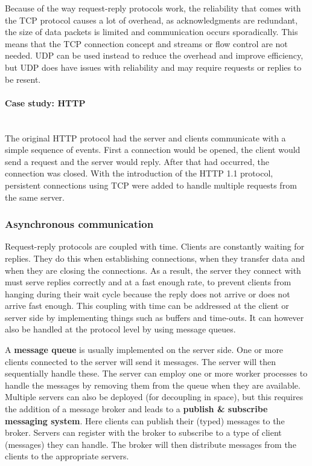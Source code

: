 \documentclass[a4paper]{article}
\newcommand{\subsubsubsection}[1]{\paragraph{#1}\mbox{}\\}
\begin{document}
Because of the way request-reply protocols work, the reliability that comes with the TCP protocol causes a lot of overhead, as acknowledgments are redundant, the size of data packets is limited and communication occurs sporadically. This means that the TCP connection concept and streams or flow control are not needed. UDP can be used instead to reduce the overhead and improve efficiency, but UDP does have issues with reliability and may require requests or replies to be resent.

\subsubsubsection{Case study: HTTP}

The original HTTP protocol had the server and clients communicate with a simple sequence of events. First a connection would be opened, the client would send a request and the server would reply. After that had occurred, the connection was closed. With the introduction of the HTTP 1.1 protocol, persistent connections using TCP were added to handle multiple requests from the same server.

\subsubsection{Asynchronous communication}

Request-reply protocols are coupled with time. Clients are constantly waiting for replies. They do this when establishing connections, when they transfer data and when they are closing the connections. As a result, the server they connect with must serve replies correctly and at a fast enough rate, to prevent clients from hanging during their wait cycle because the reply does not arrive or does not arrive fast enough. This coupling with time can be addressed at the client or server side by implementing things such as buffers and time-outs. It can however also be handled at the protocol level by using message queues.

A \textbf{message queue} is usually implemented on the server side. One or more clients connected to the server will send it messages. The server will then sequentially handle these. The server can employ one or more worker processes to handle the messages by removing them from the queue when they are available. Multiple servers can also be deployed (for decoupling in space), but this requires the addition of a message broker and leads to a \textbf{publish \& subscribe messaging system}. Here clients can publish their (typed) messages to the broker. Servers can register with the broker to subscribe to a type of client (messages) they can handle. The broker will then distribute messages from the clients to the appropriate servers.
\end{document}
